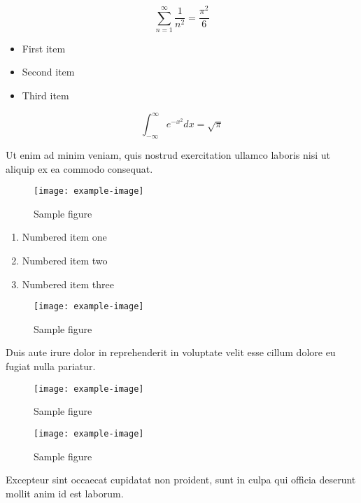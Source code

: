 \documentclass{article}
\begin{document}
\begin{equation}
    \sum_{n=1}^{\infty} \frac{1}{n^2} = \frac{\pi^2}{6}
\end{equation}

\begin{itemize}
\item First item
\item Second item
\item Third item
\end{itemize}


\begin{equation}
    \int_{-\infty}^{\infty} e^{-x^2} dx = \sqrt{\pi}
\end{equation}

Ut enim ad minim veniam, quis nostrud exercitation ullamco laboris nisi ut aliquip ex ea commodo consequat.

\begin{figure}[h]
    \centering
    \texttt{[image: example-image]}
    \caption{Sample figure}
    \label{fig:sample}
\end{figure}

\begin{enumerate}
\item Numbered item one
\item Numbered item two
\item Numbered item three
\end{enumerate}


\begin{figure}[h]
    \centering
    \texttt{[image: example-image]}
    \caption{Sample figure}
    \label{fig:sample}
\end{figure}

Duis aute irure dolor in reprehenderit in voluptate velit esse cillum dolore eu fugiat nulla pariatur.

\begin{figure}[h]
    \centering
    \texttt{[image: example-image]}
    \caption{Sample figure}
    \label{fig:sample}
\end{figure}

\begin{figure}[h]
    \centering
    \texttt{[image: example-image]}
    \caption{Sample figure}
    \label{fig:sample}
\end{figure}

Excepteur sint occaecat cupidatat non proident, sunt in culpa qui officia deserunt mollit anim id est laborum.
\end{document}
